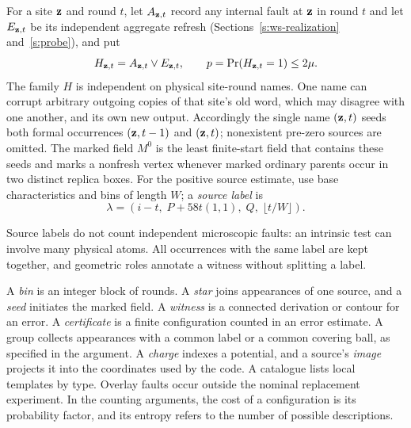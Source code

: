\begin{definition}\label{c:sources-def}
For a site \({\bf z}\) and round \(t\), let \(A_{{\bf z},t}\) record any internal fault at \({\bf z}\) in round \(t\) and let \(E_{{\bf z},t}\) be its independent aggregate refresh (Sections~\ref{s:ws-realization} and~\ref{s:probe}), and put
\[
 H_{{\bf z},t}=A_{{\bf z},t}\lor E_{{\bf z},t},\qquad p=\Pr(H_{{\bf z},t}=1)\le2\mu.
\]
The family \(H\) is independent on physical site-round names. One name can corrupt arbitrary outgoing copies of that site's old word, which may disagree with one another, and its own new output. Accordingly the single name \(({\bf z},t)\) seeds both formal occurrences \(({\bf z},t-1)\) and \(({\bf z},t)\); nonexistent pre-zero sources are omitted. The marked field \(M^0\) is the least finite-start field that contains these seeds and marks a nonfresh vertex whenever marked ordinary parents occur in two distinct replica boxes. For the positive source estimate, use base characteristics and bins of length \(W\); a \emph{source label} is
\[
 \lambda=(i-t,\;P+58t(1,1),\;Q,\;\lfloor t/W\rfloor).
\]
\end{definition}
Source labels do not count independent microscopic faults: an intrinsic test can involve many physical atoms. All occurrences with the same label are kept together, and geometric roles annotate a witness without splitting a label.

A \emph{bin} is an integer block of rounds. A \emph{star} joins appearances of one source, and a \emph{seed} initiates the marked field. A \emph{witness} is a connected derivation or contour for an error. A \emph{certificate} is a finite configuration counted in an error estimate. A group collects appearances with a common label or a common covering ball, as specified in the argument. A \emph{charge} indexes a potential, and a source's \emph{image} projects it into the coordinates used by the code. A catalogue lists local templates by type. Overlay faults occur outside the nominal replacement experiment. In the counting arguments, the cost of a configuration is its probability factor, and its entropy refers to the number of possible descriptions.

